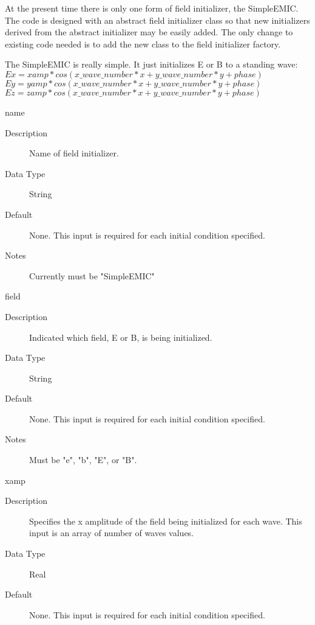 \documentclass[11pt]{amsart}
\begin{document}
At the present time there is only one form of field initializer, the SimpleEMIC.
The code is designed with an abstract field initializer class so that new
initializers derived from the abstract initializer may be easily added.  The
only change to existing code needed is to add the new class to the field
initializer factory.

The SimpleEMIC is really simple.  It just initializes E or B to a standing
wave: \\
\begin{math} Ex = xamp*cos(x\_wave\_number*x+y\_wave\_number*y+phase) \end{math} \\
\begin{math} Ey = yamp*cos(x\_wave\_number*x+y\_wave\_number*y+phase) \end{math} \\
\begin{math} Ez = zamp*cos(x\_wave\_number*x+y\_wave\_number*y+phase) \end{math}

name
\begin{description}
\item [Description] Name of field initializer.
\item [Data Type] String
\item [Default] None.  This input is required for each initial condition
specified.
\item [Notes] Currently must be "SimpleEMIC"
\end{description}

field
\begin{description}
\item [Description] Indicated which field, E or B, is being initialized.
\item [Data Type] String
\item [Default] None.  This input is required for each initial condition
specified.
\item [Notes] Must be "e", "b", "E", or "B".
\end{description}

xamp
\begin{description}
\item [Description] Specifies the x amplitude of the field being initialized for
each wave.  This input is an array of number of waves values.
\item [Data Type] Real
\item [Default] None.  This input is required for each initial condition
specified.
\end{description}
\end{document}
